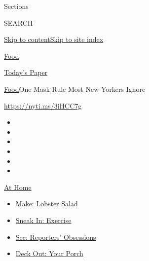 Sections

SEARCH

\protect\hyperlink{site-content}{Skip to
content}\protect\hyperlink{site-index}{Skip to site index}

\href{https://www.nytimes3xbfgragh.onion/section/food}{Food}

\href{https://myaccount.nytimes3xbfgragh.onion/auth/login?response_type=cookie\&client_id=vi}{}

\href{https://www.nytimes3xbfgragh.onion/section/todayspaper}{Today's
Paper}

\href{/section/food}{Food}\textbar{}One Mask Rule Most New Yorkers
Ignore

\url{https://nyti.ms/3iHCC7g}

\begin{itemize}
\item
\item
\item
\item
\item
\item
\end{itemize}

\href{https://www.nytimes3xbfgragh.onion/spotlight/at-home?action=click\&pgtype=Article\&state=default\&region=TOP_BANNER\&context=at_home_menu}{At
Home}

\begin{itemize}
\tightlist
\item
  \href{https://www.nytimes3xbfgragh.onion/2020/08/14/dining/lobster-salad-recipe.html?action=click\&pgtype=Article\&state=default\&region=TOP_BANNER\&context=at_home_menu}{Make:
  Lobster Salad}
\item
  \href{https://www.nytimes3xbfgragh.onion/2020/08/15/at-home/coronavirus-at-home-quick-exercises.html?action=click\&pgtype=Article\&state=default\&region=TOP_BANNER\&context=at_home_menu}{Sneak
  In: Exercise}
\item
  \href{https://www.nytimes3xbfgragh.onion/interactive/2020/at-home/even-more-reporters-editors-diaries-lists-recommendations.html?action=click\&pgtype=Article\&state=default\&region=TOP_BANNER\&context=at_home_menu}{See:
  Reporters' Obsessions}
\item
  \href{https://www.nytimes3xbfgragh.onion/2020/08/15/at-home/coronavirus-fall-patio-furniture.html?action=click\&pgtype=Article\&state=default\&region=TOP_BANNER\&context=at_home_menu}{Deck
  Out: Your Porch}
\end{itemize}

